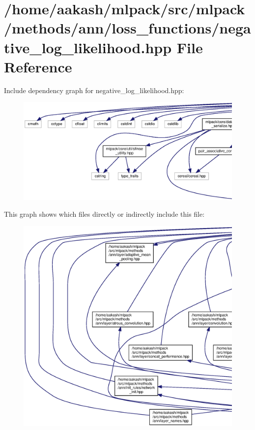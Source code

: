\section{/home/aakash/mlpack/src/mlpack/methods/ann/loss\+\_\+functions/negative\+\_\+log\+\_\+likelihood.hpp File Reference}
\label{negative__log__likelihood_8hpp}
Include dependency graph for negative\+\_\+log\+\_\+likelihood.\+hpp\+:
\nopagebreak
\begin{figure}[H]
\begin{center}
\leavevmode
\includegraphics[width=350pt]{negative__log__likelihood_8hpp__incl}
\end{center}
\end{figure}
This graph shows which files directly or indirectly include this file\+:
\nopagebreak
\begin{figure}[H]
\begin{center}
\leavevmode
\includegraphics[width=350pt]{negative__log__likelihood_8hpp__dep__incl}
\end{center}
\end{figure}
